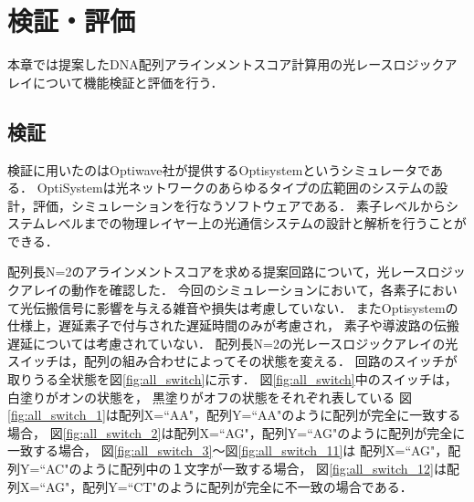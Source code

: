 \chapter{検証・評価}
本章では提案したDNA配列アラインメントスコア計算用の光レースロジックアレイについて機能検証と評価を行う．
\section{検証}
検証に用いたのはOptiwave社が提供するOptisystemというシミュレータである\cite{Optisystem}．
OptiSystemは光ネットワークのあらゆるタイプの広範囲のシステムの設計，評価，シミュレーションを行なうソフトウェアである．
素子レベルからシステムレベルまでの物理レイヤー上の光通信システムの設計と解析を行うことができる．

配列長N=2のアラインメントスコアを求める提案回路について，光レースロジックアレイの動作を確認した．
今回のシミュレーションにおいて，各素子において光伝搬信号に影響を与える雑音や損失は考慮していない．
またOptisystemの仕様上，遅延素子で付与された遅延時間のみが考慮され，
素子や導波路の伝搬遅延については考慮されていない．
配列長N=2の光レースロジックアレイの光スイッチは，配列の組み合わせによってその状態を変える．
回路のスイッチが取りうる全状態を図\ref{fig:all_switch}に示す．
図\ref{fig:all_switch}中のスイッチは，白塗りがオンの状態を，
黒塗りがオフの状態をそれぞれ表している
図\ref{fig:all_switch_1}は配列X=``AA"，配列Y=``AA"のように配列が完全に一致する場合，
図\ref{fig:all_switch_2}は配列X=``AG"，配列Y=``AG"のように配列が完全に一致する場合，
図\ref{fig:all_switch_3}〜図\ref{fig:all_switch_11}は
配列X=``AG"，配列Y=``AC"のように配列中の１文字が一致する場合，
図\ref{fig:all_switch_12}は配列X=``AG"，配列Y=``CT"のように配列が完全に不一致の場合である．

